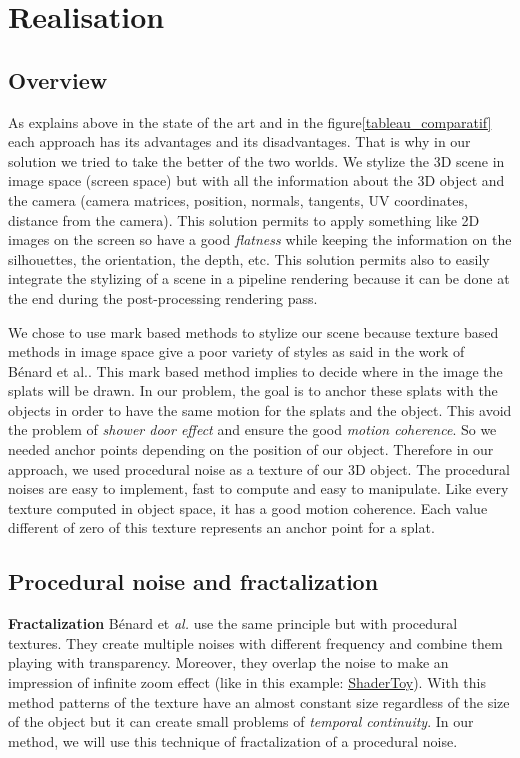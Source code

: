 \chapter{Realisation}


\section{Overview}

As explains above in the state of the art and in the figure\ref{tableau_comparatif} each approach has its advantages and its disadvantages. That is why in our solution we tried to take the better of the two worlds. We stylize the 3D scene in image space (screen space) but with all the information about the 3D object and the camera (camera matrices, position, normals, tangents, UV coordinates, distance from the camera). This solution permits to apply something like 2D images on the screen so have a good \textit{flatness} while keeping the information on the silhouettes, the orientation, the depth, etc. This solution permits also to easily integrate the stylizing of a scene in a pipeline rendering because it can be done at the end during the post-processing rendering pass. \newline

We chose to use mark based methods to stylize our scene because texture based methods in image space give a poor variety of styles as said in the work of Bénard et al.\cite{benard_dynamic_2009}. This mark based method implies to decide where in the image the splats will be drawn. In our problem, the goal is to anchor these splats with the objects in order to have the same motion for the splats and the object. This avoid the problem of \textit{shower door effect} and ensure the good \textit{motion coherence}. So we needed anchor points depending on the position of our object. Therefore in our approach, we used procedural noise\cite{perlin_improving_2002} as a texture of our 3D object. The procedural noises are easy to implement, fast to compute and easy to manipulate. Like every texture computed in object space, it has a good motion coherence. Each value different of zero of this texture represents an anchor point for a splat.


\section{Procedural noise and fractalization}


\textbf{Fractalization}
 Bénard et \textit{al.}\cite{benard_dynamic_2010} use the same principle but with procedural textures. They create multiple noises with different frequency and combine them playing with transparency. Moreover, they overlap the noise to make an impression of infinite zoom effect (like in this example: \href{https://www.shadertoy.com/view/XlBXWw?fbclid=IwAR1fU2JxQzXtks1ZcmVmzrHiv646G8w2gWceeiV-UToeFkAFMQ2NecbsGGs}{ShaderToy}). With this method patterns of the texture have an almost constant size regardless of the size of the object but it can create small problems of \textit{temporal continuity}. In our method, we will use this technique of fractalization of a procedural noise. \newline

